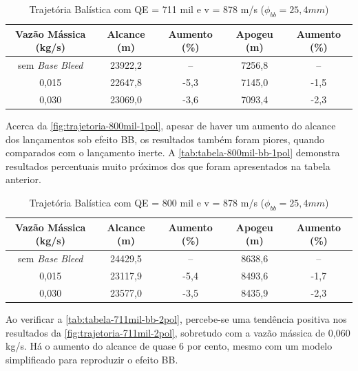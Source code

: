 \begin{table}[ht]
\centering
\caption[Trajetória Balística com QE = 711 mil e v = 878 m/s ($\phi_{bb} = 25,4\unit{mm}$]{Trajetória Balística com QE = 711 mil e v = 878 m/s ($\phi_{bb} = 25,4\unit{mm}$)}
\vspace{0.5cm}
\begin{tabular}{c|c|c|c|c}
Vazão Mássica (kg/s) & Alcance (m) & Aumento (\%) & Apogeu (m) & Aumento (\%) \\
\hline
sem \textit{Base Bleed} & 23922,2 & -- & 7256,8 & -- \\ 
0,015 & 22647,8 & -5,3 & 7145,0 & -1,5 \\
0,030 & 23069,0 & -3,6 & 7093,4 & -2,3
\end{tabular}
\label{tab:tabela-711mil-bb-1pol}
\end{table}

Acerca da \autoref{fig:trajetoria-800mil-1pol}, apesar de haver um aumento do alcance dos lançamentos sob efeito BB, os resultados também foram piores, quando comparados com o lançamento inerte. A \autoref{tab:tabela-800mil-bb-1pol} demonstra resultados percentuais muito próximos dos que foram apresentados na tabela anterior.

\begin{table}[ht]
\centering
\caption[Trajetória Balística com QE = 800 mil e v = 878 m/s ($\phi_{bb} = 25,4\unit{mm}$]{Trajetória Balística com QE = 800 mil e v = 878 m/s ($\phi_{bb} = 25,4\unit{mm}$)}
\vspace{0.5cm}
\begin{tabular}{c|c|c|c|c}
Vazão Mássica (kg/s) & Alcance (m) & Aumento (\%) & Apogeu (m) & Aumento (\%) \\
\hline
sem \textit{Base Bleed} & 24429,5 & -- & 8638,6 & -- \\ 
0,015 & 23117,9 & -5,4 & 8493,6 & -1,7 \\
0,030 & 23577,0 & -3,5 & 8435,9 & -2,3
\end{tabular}
\label{tab:tabela-800mil-bb-1pol}
\end{table}

Ao verificar a \autoref{tab:tabela-711mil-bb-2pol}, percebe-se uma tendência positiva nos resultados da \autoref{fig:trajetoria-711mil-2pol}, sobretudo com a vazão mássica de 0,060 kg/s. Há o aumento do alcance de quase 6 por cento, mesmo com um modelo simplificado para reproduzir o efeito BB.

